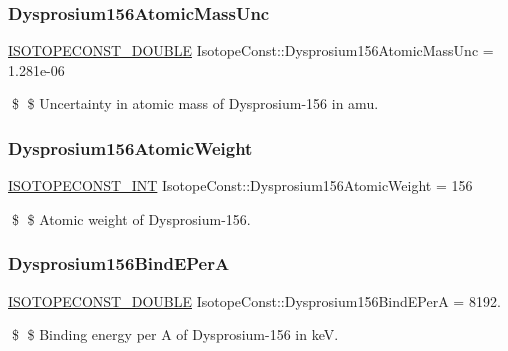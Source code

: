 \subsubsection{\texorpdfstring{Dysprosium156\+Atomic\+Mass\+Unc}{Dysprosium156AtomicMassUnc}}
{\footnotesize\ttfamily \mbox{\hyperlink{group___isotope_const-_macros_ga8f45a7272ce02c0b4c65c44636ed719a}{I\+S\+O\+T\+O\+P\+E\+C\+O\+N\+S\+T\+\_\+\+D\+O\+U\+B\+LE}} Isotope\+Const\+::\+Dysprosium156\+Atomic\+Mass\+Unc = 1.\+281e-\/06}

\$ \$ Uncertainty in atomic mass of Dysprosium-\/156 in amu. \mbox{\label{group___isotope_const-_dysprosium-_dy156_ga6c47d7867ac5d1bbfea57867edf4c14e}} 
\subsubsection{\texorpdfstring{Dysprosium156\+Atomic\+Weight}{Dysprosium156AtomicWeight}}
{\footnotesize\ttfamily \mbox{\hyperlink{group___isotope_const-_macros_ga5f18360b3e99483a35c32d789e62621c}{I\+S\+O\+T\+O\+P\+E\+C\+O\+N\+S\+T\+\_\+\+I\+NT}} Isotope\+Const\+::\+Dysprosium156\+Atomic\+Weight = 156}

\$ \$ Atomic weight of Dysprosium-\/156. \mbox{\label{group___isotope_const-_dysprosium-_dy156_gaed27817b010313065b76d1453addafb6}} 
\subsubsection{\texorpdfstring{Dysprosium156\+Bind\+E\+PerA}{Dysprosium156BindEPerA}}
{\footnotesize\ttfamily \mbox{\hyperlink{group___isotope_const-_macros_ga8f45a7272ce02c0b4c65c44636ed719a}{I\+S\+O\+T\+O\+P\+E\+C\+O\+N\+S\+T\+\_\+\+D\+O\+U\+B\+LE}} Isotope\+Const\+::\+Dysprosium156\+Bind\+E\+PerA = 8192.}

\$ \$ Binding energy per A of Dysprosium-\/156 in keV. \mbox{\label{group___isotope_const-_dysprosium-_dy156_gaef58366552b79470fcbd1d245d0356b7}} 
